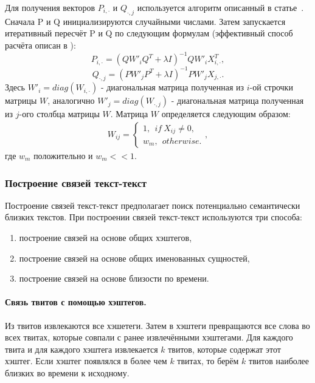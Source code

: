         Для получения векторов $P_{i,\cdot}$ и $Q_{\cdot,j}$ используется алгоритм описанный в статье~\cite{matrix_approximation}.
        Сначала P и Q инициализируются случайными числами. Затем запускается итеративный пересчёт P и Q по следующим формулам (эффективный способ расчёта описан в \cite{steck_recommender}):
        $$P_{i, \cdot} = (Q W'_i Q^T + \lambda I)^{-1} Q W'_i X_{i,\cdot}^T,$$
        $$Q_{\cdot, j} = (P W'_j P^T + \lambda I)^{-1} P W'_j X_{j,\cdot}.$$
        Здесь $W'_i = diag(W_{i, \cdot})$ - диагональная матрица полученная из $i$-ой строчки матрицы $W$,
        аналогично $W'_j = diag(W_{\cdot, j})$ - диагональная матрица полученная из $j$-ого столбца матрицы $W$.
        Матрица $W$ определяется следующим образом:
        \begin{gather}
            W_{ij} =
            \begin{cases}
                1, ~~if~X_{ij} \neq 0, \nonumber \\
                w_m, ~~otherwise.
            \end{cases},
        \end{gather}
        где $w_m$ положительно и $w_m << 1$.

    \subsubsection{Построение связей текст-текст}
    \label{subsubsec:linking}
        Построение связей текст-текст предполагает поиск потенциально семантически близких текстов.
         При построении связей текст-текст используются три способа:
        \begin{enumerate}
            \item построение связей на основе общих хэштегов,
            \item построение связей на основе общих именованных сущностей,
            \item построение связей на основе близости по времени.
        \end{enumerate}

        \paragraph{Связь твитов с помощью хэштегов.}
            Из твитов извлекаются все хэшетеги.
            Затем в хэштеги превращаются все слова во всех твитах, которые совпали с ранее извлечёнными хэштегами.
            Для каждого твита и для каждого хэштега извлекается $k$ твитов, которые содержат этот хэштег.
            Если хэштег появлялся в более чем $k$ твитах, то берём $k$ твитов наиболее близких во времени к исходному.


